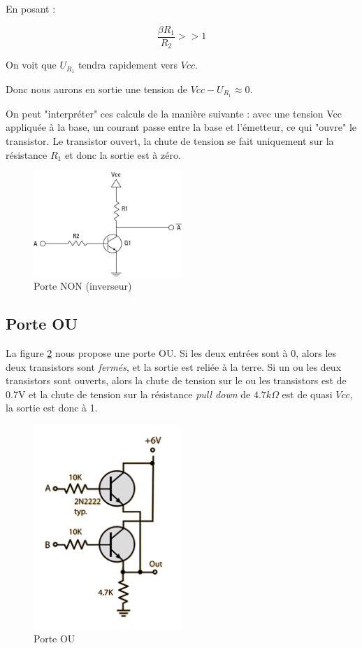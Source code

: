 \documentclass[a4paper,11pt]{book}
\theoremstyle{definition}
\begin{document}
En posant :

\[ \frac{\beta R_1}{R_2} >> 1\]

On voit que $U_{R_1}$ tendra rapidement vers $Vcc$.

Donc nous aurons en sortie une tension de $Vcc - U_{R_1} \approx 0$.

On peut "interpréter" ces calculs de la manière suivante : avec une tension Vcc appliquée à la base, un courant passe entre la base et l'émetteur, ce qui "ouvre" le transistor. Le transistor ouvert, la chute de tension se fait uniquement sur la résistance $R_1$ et donc la sortie est à zéro.

\begin{figure}
\centering
\includegraphics[width=0.5\textwidth]{media/ImplementationGates/311277.image0.jpg}
\caption{Porte NON (inverseur)}
\label{fig:NOT}
\end{figure}

\subsection{Porte OU}

La figure \ref{fig:OR} nous propose une porte OU. Si les deux entrées sont à 0, alors les deux transistors sont \emph{fermés}, et la sortie est reliée à la terre. Si un ou les deux transistors sont ouverts, alors la chute de tension sur le ou les transistors est de 0.7V et la chute de tension sur la résistance \emph{pull down} de $4.7k\Omega$ est de quasi $Vcc$, la sortie est donc à 1.

\begin{figure}
\centering
\includegraphics[width=0.5\textwidth]{media/ImplementationGates/or4.png}
\caption{Porte OU }
\label{fig:OR}
\end{figure}
\end{document}
